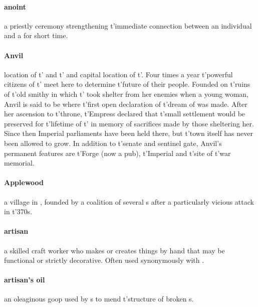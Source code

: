 \paragraph{anoint} a priestly ceremony strengthening t'\allowbreak immediate connection between an individual and a  for short time.
\paragraph{Anvil} location of t'\allowbreak {} and t'\allowbreak {} and capital location of t'\allowbreak {}. Four times a year t'\allowbreak powerful citizens of t'\allowbreak {} meet here to determine t'\allowbreak future of their people. Founded on t'\allowbreak ruins of t'\allowbreak old smithy in which t'\allowbreak {} took shelter from her enemies when a young woman, Anvil is said to be where t'\allowbreak first open declaration of t'\allowbreak dream of  was made. After her ascension to t'\allowbreak throne, t'\allowbreak Empress declared that t'\allowbreak small settlement would be preserved for t'\allowbreak lifetime of t'\allowbreak {} in memory of sacrifices made by those sheltering her. Since then Imperial parliaments have been held there, but t'\allowbreak town itself has never been allowed to grow. In addition to t'\allowbreak senate and sentinel gate, Anvil's permanent features are t'\allowbreak Forge (now a pub), t'\allowbreak Imperial  and t'\allowbreak site of t'\allowbreak war memorial.%
\paragraph{Applewood} a village in , founded by a coalition of several s after a particularly vicious  attack in t'\allowbreak \allowbreak 370s.
\paragraph{artisan} a skilled craft worker who makes or creates things by hand that may be functional or strictly decorative. Often used synonymously with .
\paragraph{artisan's oil} an oleaginous goop used by s to mend t'\allowbreak structure of broken s.
